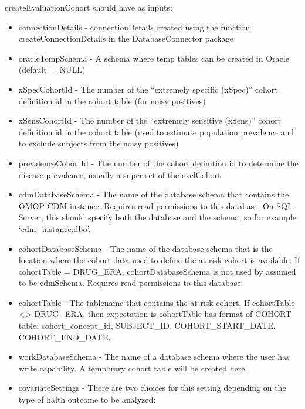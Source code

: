 \documentclass[
]{article}
\providecommand{\tightlist}{%
  \setlength{\itemsep}{0pt}\setlength{\parskip}{0pt}}
\begin{document}
createEvaluationCohort should have as inputs:

\begin{itemize}
\tightlist
\item
  connectionDetails - connectionDetails created using the function
  createConnectionDetails in the DatabaseConnector package
\item
  oracleTempSchema - A schema where temp tables can be created in Oracle
  (default==NULL)
\item
  xSpecCohortId - The number of the ``extremely specific (xSpec)''
  cohort definition id in the cohort table (for noisy positives)
\item
  xSensCohortId - The number of the ``extremely sensitive (xSens)''
  cohort definition id in the cohort table (used to estimate population
  prevalence and to exclude subjects from the noisy positives)
\item
  prevalenceCohortId - The number of the cohort definition id to
  determine the disease prevalence, usually a super-set of the
  exclCohort
\item
  cdmDatabaseSchema - The name of the database schema that contains the
  OMOP CDM instance. Requires read permissions to this database. On SQL
  Server, this should specify both the database and the schema, so for
  example `cdm\_instance.dbo'.
\item
  cohortDatabaseSchema - The name of the database schema that is the
  location where the cohort data used to define the at risk cohort is
  available. If cohortTable = DRUG\_ERA, cohortDatabaseSchema is not
  used by assumed to be cdmSchema. Requires read permissions to this
  database.
\item
  cohortTable - The tablename that contains the at risk cohort. If
  cohortTable \textless{}\textgreater{} DRUG\_ERA, then expectation is
  cohortTable has format of COHORT table: cohort\_concept\_id,
  SUBJECT\_ID, COHORT\_START\_DATE, COHORT\_END\_DATE.
\item
  workDatabaseSchema - The name of a database schema where the user has
  write capability. A temporary cohort table will be created here.
\item
  covariateSettings - There are two choices for this setting depending
  on the type of halth outcome to be analyzed:


\end{itemize}
\end{document}
